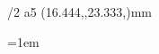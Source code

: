 \fontfam[arno]
\fontfam[unifrakturmaguntia]
\typosize[12/16]

\hsize=100mm
\vsize=148mm
\margins/2 a5 (16.444,,23.333,)mm

\parskip0pt
\parindent=1em


\everymnote{\it}
\mnoteindent=4mm
\mnotesize=20mm

\def\Vermillion{\setcmykcolor{0 71 77 11}}


\def\title#1{%
    \centerline{%
		\Arno
    	\typosize[15/]%
    	#1%
    }%
    \vskip4\baselineskip
    \_firstnoindent
}

